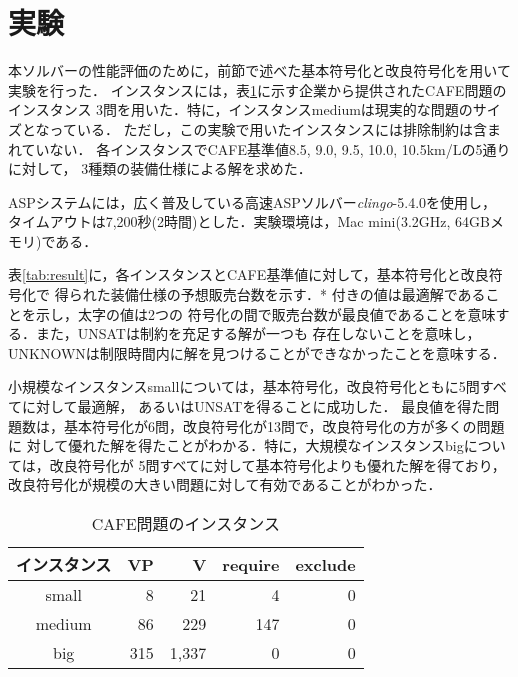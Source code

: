 \section{実験}
本ソルバーの性能評価のために，前節で述べた基本符号化と改良符号化を用いて実験を行った．
インスタンスには，表\ref{tab:instance}に示す企業から提供されたCAFE問題のインスタンス
3問を用いた．特に，インスタンスmediumは現実的な問題のサイズとなっている．
ただし，この実験で用いたインスタンスには排除制約は含まれていない．
各インスタンスでCAFE基準値8.5, 9.0, 9.5, 10.0, 10.5km/Lの5通りに対して，
3種類の装備仕様による解を求めた．

ASPシステムには，広く普及している高速ASPソルバー\textit{clingo}-5.4.0を使用し，
タイムアウトは7,200秒(2時間)とした．実験環境は，Mac mini(3.2GHz, 64GBメモリ)である．

表\ref{tab:result}に，各インスタンスとCAFE基準値に対して，基本符号化と改良符号化で
得られた装備仕様の予想販売台数を示す．* 付きの値は最適解であることを示し，太字の値は2つの
符号化の間で販売台数が最良値であることを意味する．また，UNSATは制約を充足する解が一つも
存在しないことを意味し，UNKNOWNは制限時間内に解を見つけることができなかったことを意味する．


小規模なインスタンスsmallについては，基本符号化，改良符号化ともに5問すべてに対して最適解，
あるいはUNSATを得ることに成功した．
最良値を得た問題数は，基本符号化が6問，改良符号化が13問で，改良符号化の方が多くの問題に
対して優れた解を得たことがわかる．特に，大規模なインスタンスbigについては，改良符号化が
5問すべてに対して基本符号化よりも優れた解を得ており，
改良符号化が規模の大きい問題に対して有効であることがわかった．


\begin{table}[tb]
 \caption{CAFE問題のインスタンス}
 \centering
 \begin{tabular}{crrrr} \bhline
  インスタンス & VP	& V	& require & exclude	\\\hline
  small	    & 8		& 21	& 4	  & 0	        \\
  medium    & 86	& 229	& 147	  & 0	        \\
  big	    & 315	& 1,337	& 0	  & 0        	\\\hline
 \end{tabular}
 \label{tab:instance}
\end{table}

